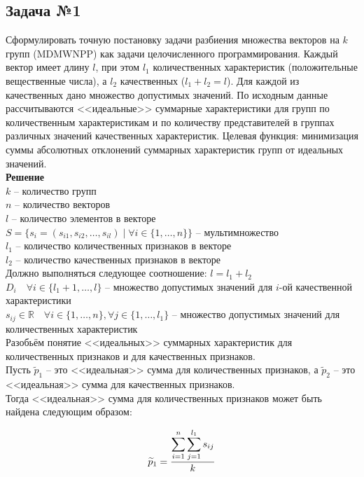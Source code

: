 \documentclass[14pt,fleqn]{extarticle}
\begin{document}
    \subsection*{Задача №1}
	Сформулировать точную постановку задачи разбиения множества векторов на $k$ групп (MDMWNPP) как задачи целочисленного программирования. Каждый вектор имеет длину $l$, при этом $l_1$ количественных характеристик (положительные вещественные числа), а $l_2$ качественных ($l_1 + l_2 = l$). Для каждой из качественных дано множество допустимых значений. По исходным данные рассчитываются <<идеальные>> суммарные характеристики для групп по количественным характеристикам и по количеству представителей в группах различных значений качественных характеристик. Целевая функция: минимизация суммы абсолютных отклонений суммарных характеристик групп от идеальных значений.\\
	
	\textbf{Решение}\\
	$k$ -- количество групп\\
	$n$ -- количество векторов\\
	$l$ -- количество элементов в векторе\\
	$S = \{s_i = (s_{i1}, s_{i2}, \dots, s_{il}) \; | \; \forall i \in \{1, \dots, n\} \}$ -- мультимножество\\
	$l_1$ -- количество количественных признаков в векторе\\
	$l_2$ -- количество качественных признаков в векторе\\
	Должно выполняться следующее соотношение: $l = l_1 + l_2$\\
	$D_i \quad \forall i \in \{l_1 + 1, \dots, l\}$ -- множество допустимых значений для $i$-ой качественной характеристики\\
	$s_{ij} \in \mathbb{R} \quad \forall i \in \{1, \dots, n\}, \forall j \in \{1, \dots, l_1\}$ -- множество допустимых значений для количественных характеристик\\
	
	Разобьём понятие <<идеальных>> суммарных характеристик для количественных признаков и для качественных признаков.\\
	
	Пусть $\widetilde{p}_1$ -- это <<идеальная>> сумма для количественных признаков, а $\widetilde{p}_2$ -- это <<идеальная>> сумма для качественных признаков.\\

	Тогда <<идеальная>> сумма для количественных признаков может быть найдена следующим образом:
	\begin{ceqn}
		\begin{align*}
			\widetilde{p}_1 = \dfrac{\smashoperator[r]{\sum_{i=1}^{n}} \smashoperator[r]{\sum_{j=1}^{l_1}} s_{ij}}{k}
		\end{align*}
	\end{ceqn}
\end{document}
